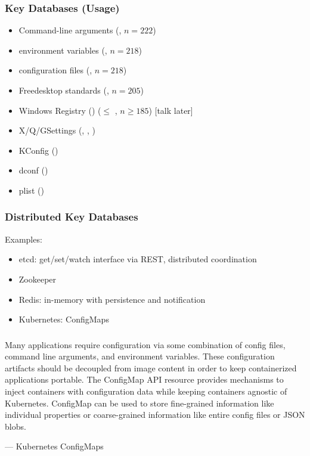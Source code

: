 \begin{frame}
	\frametitle{Key Databases (Usage)}

	\methodQuestion{} 

	\begin{itemize}
	\item Command-line arguments (, $n=222$)
	\item environment variables (, $n=218$)
	\item configuration files (, $n=218$)
	\item Freedesktop standards (, $n=205$)
	\item Windows Registry () ($\leq$ , $n\geq185$) [talk later]
	\item X/Q/GSettings (, , )
	\item KConfig ()
	\item dconf ()
	\item plist ()
	\end{itemize}

\end{frame}

\begin{frame}
	\frametitle{Distributed Key Databases}

	Examples:

	\begin{itemize}
	\item etcd: get/set/watch interface via REST, distributed coordination
	\item Zookeeper
	\item Redis: in-memory with persistence and notification
	\item Kubernetes: ConfigMaps
	\end{itemize}
\end{frame}

\begin{frame}
	\frametitle{}
	Many applications require configuration via some combination of config files, command line arguments, and environment variables. These configuration artifacts should be decoupled from image content in order to keep containerized applications portable. The ConfigMap API resource provides mechanisms to inject containers with configuration data while keeping containers agnostic of Kubernetes. ConfigMap can be used to store fine-grained information like individual properties or coarse-grained information like entire config files or JSON blobs.
	\par\raggedleft--- \textup{Kubernetes ConfigMaps}
\end{frame}

